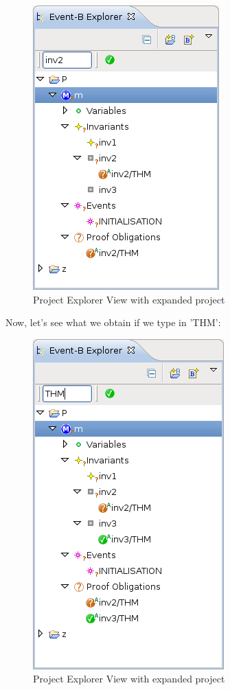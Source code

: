 \begin{figure}[!h]
\begin{center}
	\includegraphics{img/reference/ref_01_project_explorer6.png}
	\caption{Project Explorer View with expanded project}
	\label{fig_ref_01_project_explorer6}
\end{center}
\end{figure}

Now, let's see what we obtain if we type in 'THM': 

\begin{figure}[!h]
\begin{center}
	\includegraphics{img/reference/ref_01_project_explorer7.png}
	\caption{Project Explorer View with expanded project}
	\label{fig_ref_01_project_explorer7}
\end{center}
\end{figure}

